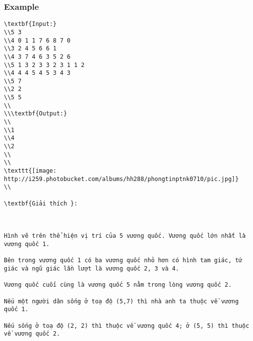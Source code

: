 \subsubsection{   Example  }
\begin{verbatim}
\textbf{Input:}
\\5 3
\\4 0 1 1 7 6 8 7 0
\\3 2 4 5 6 6 1
\\4 3 7 4 6 3 5 2 6
\\5 1 3 2 3 3 2 3 1 1 2
\\4 4 4 5 4 5 3 4 3
\\5 7
\\2 2
\\5 5
\\
\\\textbf{Output:}
\\
\\1
\\4
\\2
\\
\\
\texttt{[image: http://i259.photobucket.com/albums/hh288/phongtinptnk0710/pic.jpg]}
\\

\textbf{Giải thích }: 

 

Hình vẽ trên thể hiện vị trí của 5 vương quốc. Vương quốc lớn nhất là vương quốc 1. 

Bên trong vương quốc 1 có ba vương quốc nhỏ hơn có hình tam giác, tứ giác và ngũ giác lần lượt là vương quốc 2, 3 và 4.

Vương quốc cuối cùng là vương quốc 5 nằm trong lòng vương quốc 2. 

Nếu một người dân sống ở toạ độ (5,7) thì nhà anh ta thuộc về vương quốc 1. 

Nếu sống ở toạ độ (2, 2) thì thuộc về vương quốc 4; ở (5, 5) thì thuộc về vương quốc 2.\end{verbatim}
